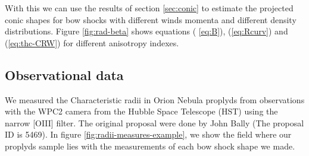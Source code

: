 
With this we can use the results of section \ref{sec:conic} to estimate the projected conic shapes for bow shocks with different winds 
momenta and different density distributions. Figure \ref{fig:rad-beta} shows equations ( \ref{eq:B}), (\ref{eq:Rcurv}) and (\ref{eq:thc-CRW}) for different anisotropy indexes. 




 
\subsection{Observational data}

We measured the Characteristic radii in Orion Nebula proplyds from observations with the WPC2 camera from the Hubble Space Telescope (HST) using the narrow [OIII] filter. The original proposal were done by John Bally (The proposal ID is 5469). In figure \ref{fig:radii-measures-example}, we show the field where our proplyds sample lies with the measurements of each bow shock shape we made.

